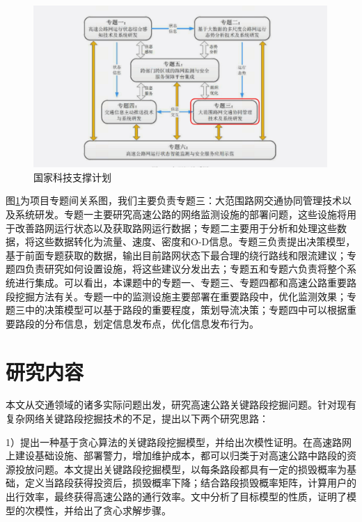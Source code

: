 				\begin{figure}[h]
				\centering
						\begin{minipage}{0.8\linewidth}
							\centering
							\includegraphics[width=4.4in]{picture/zhichengjihua}
							\caption{国家科技支撑计划}
							\label{zhichengjihua}
						\end{minipage}%
				\end{figure}
图\ref{zhichengjihua}为项目专题间关系图，我们主要负责专题三：大范围路网交通协同管理技术以及系统研发。专题一主要研究高速公路的网络监测设施的部署问题，这些设施将用于改善路网运行状态以及获取路网运行数据；专题二主要用于分析和处理这些数据，将这些数据转化为流量、速度、密度和O-D信息。专题三负责提出决策模型，基于前面专题获取的数据，输出目前路网状态下最合理的绕行路线和限流建议；专题四负责研究如何设置设施，将这些建议分发出去；专题五和专题六负责将整个系统进行集成。可以看出，本课题中的专题一、专题三、专题四都和高速公路重要路段挖掘方法有关。专题一中的监测设施主要部署在重要路段中，优化监测效果；专题三中的决策模型可以基于路段的重要程度，策划导流决策；专题四中可以根据重要路段的分布信息，划定信息发布点，优化信息发布行为。





\section{研究内容}
    	本文从交通领域的诸多实际问题出发，研究高速公路关键路段挖掘问题。针对现有复杂网络关键路段挖掘技术的不足，提出以下两个研究思路：
    
		1）提出一种基于贪心算法的关键路段挖掘模型，并给出次模性证明。在高速路网上建设基础设施、部署警力，增加维护成本，都可以归类于对高速公路中路段的资源投放问题。本文提出关键路段挖掘模型，以每条路段都具有一定的损毁概率为基础，定义当路段获得投资后，损毁概率下降；结合路段损毁概率矩阵，计算用户的出行效率，最终获得高速公路的通行效率。文中分析了目标模型的性质，证明了模型的次模性，并给出了贪心求解步骤。

